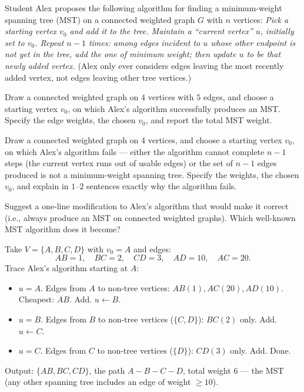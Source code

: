 \documentclass[test,letterpaper]{cs20}
\begin{document}
\begin{problem}

Student Alex proposes the following algorithm for finding a minimum-weight spanning tree (MST) on a connected weighted graph $G$ with $n$ vertices: \emph{Pick a starting vertex $v_0$ and add it to the tree. Maintain a ``current vertex'' $u$, initially set to $v_0$. Repeat $n - 1$ times: among edges incident to $u$ whose other endpoint is not yet in the tree, add the one of minimum weight; then update $u$ to be that newly added vertex.} (Alex only ever considers edges leaving the most recently added vertex, not edges leaving other tree vertices.)

\subproblem Draw a connected weighted graph on $4$ vertices with $5$ edges, and choose a starting vertex $v_0$, on which Alex's algorithm successfully produces an MST. Specify the edge weights, the chosen $v_0$, and report the total MST weight.

\subproblem Draw a connected weighted graph on $4$ vertices, and choose a starting vertex $v_0$, on which Alex's algorithm fails --- either the algorithm cannot complete $n - 1$ steps (the current vertex runs out of usable edges) or the set of $n - 1$ edges produced is not a minimum-weight spanning tree. Specify the weights, the chosen $v_0$, and explain in $1$--$2$ sentences exactly why the algorithm fails.

\subproblem Suggest a one-line modification to Alex's algorithm that would make it correct (i.e., always produce an MST on connected weighted graphs). Which well-known MST algorithm does it become?

\begin{solution}
\subsolution Take $V = \{A, B, C, D\}$ with $v_0 = A$ and edges:
\[
AB = 1, \quad BC = 2, \quad CD = 3, \quad AD = 10, \quad AC = 20.
\]
Trace Alex's algorithm starting at $A$:
\begin{itemize}
\item $u = A$. Edges from $A$ to non-tree vertices: $AB(1), AC(20), AD(10)$. Cheapest: $AB$. Add. $u \leftarrow B$.
\item $u = B$. Edges from $B$ to non-tree vertices ($\{C, D\}$): $BC(2)$ only. Add. $u \leftarrow C$.
\item $u = C$. Edges from $C$ to non-tree vertices ($\{D\}$): $CD(3)$ only. Add. Done.
\end{itemize}
Output: $\{AB, BC, CD\}$, the path $A - B - C - D$, total weight $6$ --- the MST (any other spanning tree includes an edge of weight $\geq 10$).


\end{solution}
\end{problem}
\end{document}
